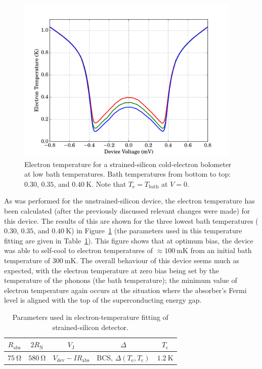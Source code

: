 \par
\begin{figure}[tb]
\begin{center}
\includegraphics[width = 0.95\textwidth]{figures/strained_Te}
\caption[Electron temperature for a strained-silicon cold-electron bolometer]{Electron temperature for a strained-silicon cold-electron bolometer at low bath temperatures. Bath temperatures from bottom to top: $0.30$, $0.35$, and $0.40~\mathrm{K}$. Note that $T_{\mathrm{e}} = T_{\mathrm{bath}}$ at $V = 0$.}
\label{fig:strainedTe}
\end{center}
\end{figure}
As was performed for the unstrained-silicon device, the electron temperature has been calculated (after the previously discussed relevant changes were made) for this device. The results of this are shown for the three lowest bath temperatures ($0.30$, $0.35$, and $0.40~\mathrm{K}$) in Figure~\ref{fig:strainedTe} (the parameters used in this temperature fitting are given in Table~\ref{tab:strainedTeParams_dark}). This figure shows that at optimum bias, the device was able to self-cool to electron temperatures of $\approx 100~\mathrm{mK}$ from an initial bath temperature of $300~\mathrm{mK}$. The overall behaviour of this device seems much as expected, with the electron temperature at zero bias being set by the temperature of the phonons (the bath temperature); the minimum value of electron temperature again occurs at the situation where the absorber's Fermi level is aligned with the top of the superconducting energy gap.
\begin{table}[htb]
\caption[Parameters used in electron-temperature fitting of strained-silicon detector with optical loading]{Parameters used in electron-temperature fitting of strained-silicon detector.} 
\label{tab:strainedTeParams_dark}
\centering
\begin{tabular}{ccccc}
\toprule\toprule
$R_{\mathrm{abs}}$ & $2R_{\mathrm{N}}$ & $V_{\mathrm{J}}$ & $\varDelta$ & $T_{\mathrm{c}}$ \\ \midrule
$75~\mathrm{\Omega}$ & $580~\mathrm{\Omega}$ & $V_{\mathrm{dev}} - IR_{\mathrm{abs}}$ 
& BCS, $\varDelta\left(T_{\mathrm{e}},T_{\mathrm{c}}\right)$ & $1.2~\mathrm{K}$ \\
\bottomrule
\end{tabular}
\end{table}
%
